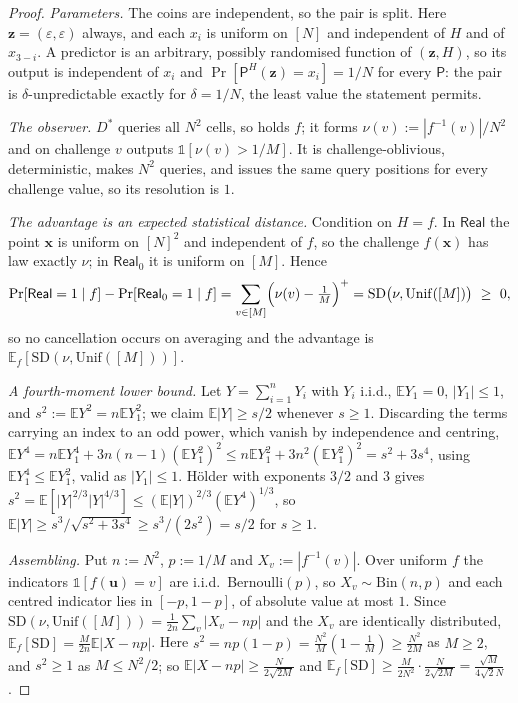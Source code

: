 \documentclass{aicr-solution}
\newcommand{\Real}{\mathsf{Real}}
\newcommand{\Prob}[1]{\Pr\!\left[#1\right]}
\newcommand{\Exp}{\mathbb{E}}
\newcommand{\vx}{\mathbf{x}}
\newcommand{\vz}{\mathbf{z}}
\newcommand{\vu}{\mathbf{u}}
\newcommand{\ind}{\mathbb{1}}
\newcommand{\Unif}{\mathrm{Unif}}
\begin{document}
\begin{proof}
\emph{Parameters.} The coins are independent, so the pair is split. Here
$\vz=(\varepsilon,\varepsilon)$ always, and each $x_i$ is uniform on $[N]$ and
independent of $H$ and of $x_{3-i}$. A predictor is an arbitrary, possibly
randomised function of $(\vz,H)$, so its output is independent of $x_i$ and
$\Prob{\mathsf P^{H}(\vz)=x_i}=1/N$ for every $\mathsf P$: the pair is
$\delta$-unpredictable exactly for $\delta=1/N$, the least value the statement
permits.

\emph{The observer.} $D^{*}$ queries all $N^{2}$ cells, so holds $f$; it forms
$\nu(v):=|f^{-1}(v)|/N^{2}$ and on challenge $v$ outputs $\ind[\nu(v)>1/M]$. It is
challenge-oblivious, deterministic, makes $N^{2}$ queries, and issues the same
query positions for every challenge value, so its resolution is $1$.

\emph{The advantage is an expected statistical distance.} Condition on $H=f$. In
$\Real$ the point $\vx$ is uniform on $[N]^{2}$ and independent of $f$, so the
challenge $f(\vx)$ has law exactly $\nu$; in $\Real_0$ it is uniform on $[M]$.
Hence
\[
  \Prob{\Real=1\mid f}-\Prob{\Real_0=1\mid f}
  =\sum_{v\in[M]}\Bigl(\nu(v)-\tfrac1M\Bigr)^{+}
  =\mathrm{SD}\bigl(\nu,\Unif([M])\bigr)\ \ge\ 0,
\]
so no cancellation occurs on averaging and the advantage is
$\Exp_f[\mathrm{SD}(\nu,\Unif([M]))]$.

\emph{A fourth-moment lower bound.} Let $Y=\sum_{i=1}^{n}Y_i$ with $Y_i$ i.i.d.,
$\Exp Y_1=0$, $|Y_1|\le1$, and $s^{2}:=\Exp Y^{2}=n\Exp Y_1^{2}$; we claim
$\Exp|Y|\ge s/2$ whenever $s\ge1$. Discarding the terms carrying an index to an odd
power, which vanish by independence and centring,
$\Exp Y^{4}=n\Exp Y_1^{4}+3n(n-1)(\Exp Y_1^{2})^{2}\le n\Exp Y_1^{2}+3n^{2}(\Exp Y_1^{2})^{2}
=s^{2}+3s^{4}$, using $\Exp Y_1^{4}\le\Exp Y_1^{2}$, valid as $|Y_1|\le1$. H\"older
with exponents $3/2$ and $3$ gives
$s^{2}=\Exp[|Y|^{2/3}|Y|^{4/3}]\le(\Exp|Y|)^{2/3}(\Exp Y^{4})^{1/3}$, so
$\Exp|Y|\ge s^{3}/\sqrt{s^{2}+3s^{4}}\ge s^{3}/(2s^{2})=s/2$ for $s\ge1$.

\emph{Assembling.} Put $n:=N^{2}$, $p:=1/M$ and $X_v:=|f^{-1}(v)|$. Over uniform
$f$ the indicators $\ind[f(\vu)=v]$ are i.i.d.\ Bernoulli$(p)$, so
$X_v\sim\mathrm{Bin}(n,p)$ and each centred indicator lies in $[-p,1-p]$, of
absolute value at most $1$. Since
$\mathrm{SD}(\nu,\Unif([M]))=\frac{1}{2n}\sum_v|X_v-np|$ and the $X_v$ are
identically distributed, $\Exp_f[\mathrm{SD}]=\frac{M}{2n}\Exp|X-np|$. Here
$s^{2}=np(1-p)=\frac{N^{2}}{M}(1-\frac1M)\ge\frac{N^{2}}{2M}$ as $M\ge2$, and
$s^{2}\ge1$ as $M\le N^{2}/2$; so $\Exp|X-np|\ge\frac{N}{2\sqrt{2M}}$ and
$\Exp_f[\mathrm{SD}]\ge\frac{M}{2N^{2}}\cdot\frac{N}{2\sqrt{2M}}=\frac{\sqrt M}{4\sqrt2N}$.
\end{proof}
\end{document}
